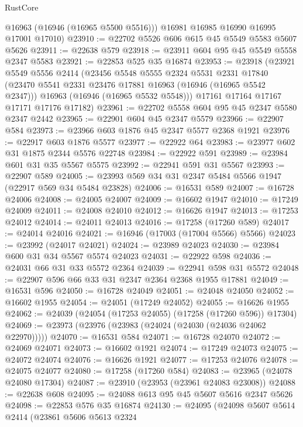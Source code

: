 \begin{lexlean}{RustCore}
\begin{coremodule}
        @16963
        (@16946 (@16965 @5500 @5516)))
      @16981
      @16985
      @16990
      @16995
      @17001
      @17010)
@23910 := @22702 @5526 @606 @615 @45 @5549 @5583 @5607 @5626
@23911 := @22638 @579
@23918 := @23911 @604 @95 @45 @5549 @5558 @2347 @5583
@23921 := @22853 @525 @35 @16874
@23953 := @23918
    (@23921
      @5549
      @5556
      @2414
      (@23456
        @5548
        @5555
        @2324
        @5531
        @2331
        @17840
        (@23470 @5541 @2331 @23476 @17881 @16963 (@16946 (@16965 @5542 @2347)))
        @16963
        (@16946 (@16965 @5532 @5548)))
      @17161
      @17164
      @17167
      @17171
      @17176
      @17182)
@23961 := @22702 @5558 @604 @95 @45 @2347 @5580 @2347 @2442
@23965 := @22901 @604 @45 @2347 @5579
@23966 := @22907 @584
@23973 := @23966 @603 @1876 @45 @2347 @5577 @2368 @1921
@23976 := @22917 @603 @1876 @5577
@23977 := @22922 @64
@23983 := @23977 @602 @31 @1875 @2344 @5576 @22748
@23984 := @22922 @591
@23989 := @23984 @601 @31 @35 @5567 @5575
@23992 := @22941 @591 @31 @5567
@23993 := @22907 @589
@24005 := @23993 @569 @34 @31 @2347 @5484 @5566 @1947 (@22917 @569 @34 @5484 @23828)
@24006 := @16531 @589
@24007 := @16728 @24006
@24008 := @24005 @24007
@24009 := @16602 @1947
@24010 := @17249 @24009
@24011 := @24008 @24010
@24012 := @16626 @1947
@24013 := @17253 @24012
@24014 := @24011 @24013
@24016 := @17258 (@17260 @589)
@24017 := @24014 @24016
@24021 := @16946 (@17003 (@17004 @5566) @5566)
@24023 := @23992 (@24017 @24021)
@24024 := @23989 @24023
@24030 := @23984 @600 @31 @34 @5567 @5574 @24023
@24031 := @22922 @598
@24036 := @24031 @66 @31 @33 @5572 @2364
@24039 := @22941 @598 @31 @5572
@24048 := @22907 @596 @66 @33 @31 @2347 @2364 @2368 @1955 @17881
@24049 := @16531 @596
@24050 := @16728 @24049
@24051 := @24048 @24050
@24052 := @16602 @1955
@24054 := @24051 (@17249 @24052)
@24055 := @16626 @1955
@24062 := @24039 (@24054 (@17253 @24055) (@17258 (@17260 @596)) @17304)
@24069 := @23973 (@23976 (@23983 (@24024 (@24030 (@24036 @24062 @22970)))))
@24070 := @16531 @584
@24071 := @16728 @24070
@24072 := @24069 @24071
@24073 := @16602 @1921
@24074 := @17249 @24073
@24075 := @24072 @24074
@24076 := @16626 @1921
@24077 := @17253 @24076
@24078 := @24075 @24077
@24080 := @17258 (@17260 @584)
@24083 := @23965 (@24078 @24080 @17304)
@24087 := @23910 (@23953 (@23961 @24083 @23008))
@24088 := @22638 @608
@24095 := @24088 @613 @95 @45 @5607 @5616 @2347 @5626
@24098 := @22853 @576 @35 @16874
@24130 := @24095
    (@24098
      @5607
      @5614
      @2414
      (@23861
        @5606
        @5613
        @2324

\end{coremodule}
\end{lexlean}
